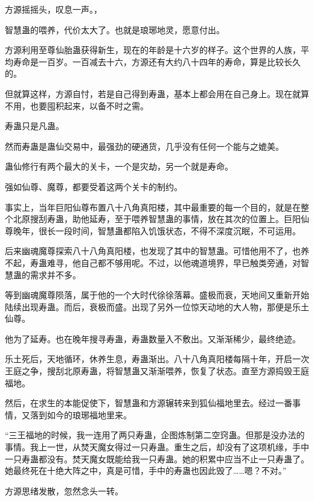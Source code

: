 
\begin{this_body}



方源摇摇头，叹息一声。，

智慧蛊的喂养，代价太大了。也就是琅琊地灵，愿意付出。

方源利用至尊仙胎蛊获得新生，现在的年龄是十六岁的样子。这个世界的人族，平均寿命是一百岁。一百减去十六，方源还有大约八十四年的寿命，算是比较长久的。

但就算这样，方源自忖，若是自己得到寿蛊，基本上都会用在自己身上。现在就算不用，也要囤积起来，以备不时之需。

寿蛊只是凡蛊。

然而寿蛊是蛊仙交易中，最强劲的硬通货，几乎没有任何一个能与之媲美。

蛊仙修行有两个最大的关卡，一个是灾劫，另一个就是寿命。

强如仙尊、魔尊，都要受着这两个关卡的制约。

事实上，当年巨阳仙尊布置八十八角真阳楼，其中最重要的每一个目的，就是在整个北原搜刮寿蛊，助他延寿，至于喂养智慧蛊的事情，放在其次的位置上。巨阳仙尊晚年，很长一段时间，智慧蛊都陷入饥饿状态，不得不深度沉眠，不可运用。

后来幽魂魔尊探索八十八角真阳楼，也发现了其中的智慧蛊。可惜他用不了，也养不起，寿蛊难寻，他自己都不够用呢。不过，以他魂道境界，早已触类旁通，对智慧蛊的需求并不多。

等到幽魂魔尊陨落，属于他的一个大时代徐徐落幕。盛极而衰，天地间又重新开始陆续出现寿蛊。而后，衰极而盛。出现了另外一位惊天动地的大人物，那便是乐土仙尊。

他为了延寿。也在晚年搜寻寿蛊，寿蛊数量入不敷出。又渐渐稀少，最终绝迹。

乐土死后，天地循环，休养生息，寿蛊渐出。八十八角真阳楼每隔十年，开启一次王庭之争，搜刮北原寿蛊，将智慧蛊又渐渐喂养，恢复了状态。直至方源捣毁王庭福地。

然后，在求生的本能促使下，智慧蛊和方源辗转来到狐仙福地里去。经过一番事情，又落到如今的琅琊福地里来。

“三王福地的时候，我一连用了两只寿蛊，企图炼制第二空窍蛊。但那是没办法的事情。我上一世，从焚天魔女得过一只寿蛊。重生之后，却没有了这项机缘，手中一只寿蛊都没有。焚天魔女既能给我一只寿蛊。她的积累中应当不止一只寿蛊了。她最终死在十绝大阵之中，真是可惜，手中的寿蛊也因此毁了……嗯？不对。”

方源思绪发散，忽然念头一转。


\end{this_body}
